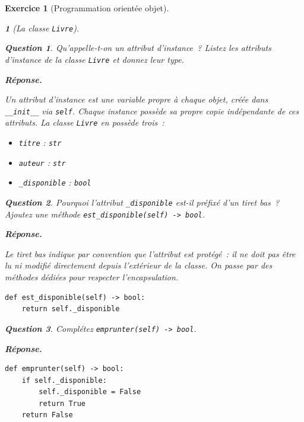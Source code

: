 \documentclass{article}
\theoremstyle{exostyle}
\newtheorem{exo}{Exercice}
\theoremstyle{partiestyle}
\newtheorem{partie}{}[exo]
\theoremstyle{questionstyle}
\newtheorem{questionpartie}{Question}[partie]
\newenvironment{reponse}{%
    \par\smallskip\noindent\textbf{Réponse.}\enspace\ignorespaces
}{%
    \par\smallskip
}
\begin{document}
\begin{exo}[Programmation orientée objet]

    \begin{partie}[La classe \texttt{Livre}]

        \begin{questionpartie}
            Qu'appelle-t-on un \textit{attribut d'instance}~? Listez les attributs d'instance de la classe \texttt{Livre} et donnez leur type.
        \end{questionpartie}
        \begin{reponse}
            Un attribut d'instance est une variable propre à chaque objet, créée dans \texttt{\_\_init\_\_} via \texttt{self}. Chaque instance possède sa propre copie indépendante de ces attributs. La classe \texttt{Livre} en possède trois~:
            \begin{itemize}
                \item \texttt{titre} : \texttt{str}
                \item \texttt{auteur} : \texttt{str}
                \item \texttt{\_disponible} : \texttt{bool}
            \end{itemize}
        \end{reponse}

        \begin{questionpartie}
            Pourquoi l'attribut \texttt{\_disponible} est-il préfixé d'un tiret bas~? Ajoutez une méthode \texttt{est\_disponible(self) -> bool}.
        \end{questionpartie}
        \begin{reponse}
            Le tiret bas indique par convention que l'attribut est \textit{protégé}~: il ne doit pas être lu ni modifié directement depuis l'extérieur de la classe. On passe par des méthodes dédiées pour respecter l'encapsulation.
\begin{lstlisting}
def est_disponible(self) -> bool:
    return self._disponible
\end{lstlisting}
        \end{reponse}

        \begin{questionpartie}
            Complétez \texttt{emprunter(self) -> bool}.
        \end{questionpartie}
        \begin{reponse}
\begin{lstlisting}
def emprunter(self) -> bool:
    if self._disponible:
        self._disponible = False
        return True
    return False
\end{lstlisting}
        \end{reponse}


\end{partie}
\end{exo}
\end{document}
